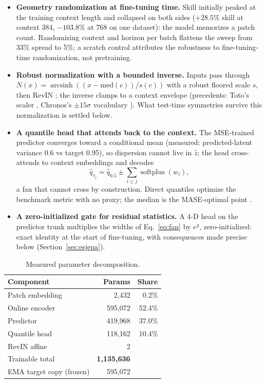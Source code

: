 \begin{itemize}
\item \textbf{Geometry randomization at fine-tuning time.} Skill
initially peaked at the training context length and collapsed on both
sides ($+28.5\%$ skill at context 384, $-103.8\%$ at 768 on one
dataset): the model memorizes a patch count. Randomizing context and
horizon per batch flattens the sweep from 33\% spread to 5\%; a scratch
control attributes the robustness to fine-tuning-time randomization, not
pretraining.
\item \textbf{Robust normalization with a bounded inverse.} Inputs pass
through $N(x) = \operatorname{arcsinh}((x - \mathrm{med}(c))/s(c))$ with
a robust floored scale $s$, then RevIN \citep{kim2022revin}; the inverse
clamps to a context envelope (precedents: Toto's scaler
\citep{cohen2024toto}, Chronos's $\pm 15\sigma$ vocabulary
\citep{ansari2024chronos}). What test-time symmetries survive this
normalization is settled below.
\item \textbf{A quantile head that attends back to the context.} The
MSE-trained predictor converges toward a conditional mean (measured:
predicted-latent variance 0.6 vs target 0.95), so dispersion cannot live
in $\hat z$; the head cross-attends to context embeddings and decodes
\begin{equation}
\hat q_{\tau_j} = \hat q_{0.5} \pm \textstyle\sum_{i \le j}
\operatorname{softplus}(w_i),
\label{eq:fan}
\end{equation}
a fan that cannot cross by construction. Direct quantiles optimize the
benchmark metric with no proxy; the median is the MASE-optimal point
\citep{koenker1978quantile,hyndman2006mase}.
\item \textbf{A zero-initialized gate for residual statistics.} A 4-D
head on the predictor trunk multiplies the widths of
Eq.~\ref{eq:fan} by $e^{g}$, zero-initialized: exact identity at the
start of fine-tuning, with consequences made precise below
(Section~\ref{sec:esjepa}).
\end{itemize}

\begin{table}[b]
\centering
\small
\begin{tabular}{lrr}
\toprule
Component & Params & Share \\
\midrule
Patch embedding & 2{,}432 & 0.2\% \\
Online encoder & 595{,}072 & 52.4\% \\
Predictor & 419{,}968 & 37.0\% \\
Quantile head & 118{,}162 & 10.4\% \\
RevIN affine & 2 & \\
\midrule
Trainable total & \textbf{1{,}135{,}636} & \\
EMA target copy (frozen) & 595{,}072 & \\
\bottomrule
\end{tabular}
\caption{Measured parameter decomposition.}
\label{tab:params}
\end{table}


